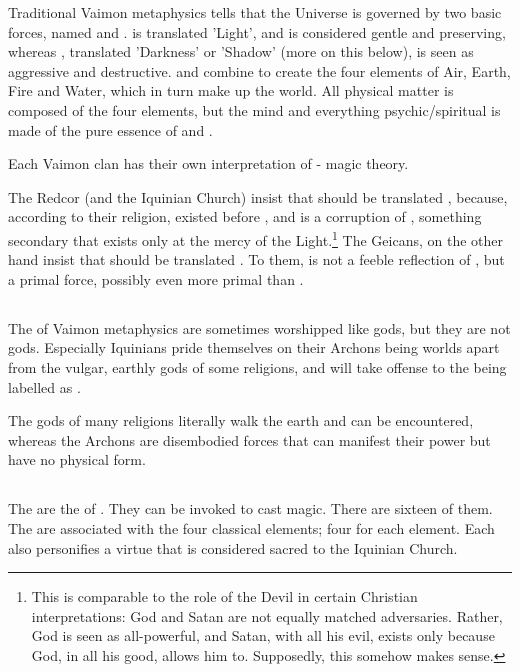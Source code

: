 Traditional Vaimon metaphysics tells that the Universe is governed by two basic forces, named  and . \Iquin{} is translated 'Light', and is considered gentle and preserving, whereas \Itzach{}, translated 'Darkness' or 'Shadow' (more on this below), is seen as aggressive and destructive. \Iquin{} and \Itzach{} combine to create the four elements of Air, Earth, Fire and Water, which in turn make up the world. All physical matter is composed of the four elements, but the mind and everything psychic/spiritual is made of the pure essence of \Iquin{} and \Itzach{}. 



Each Vaimon clan has their own interpretation of \Iquin{}-\Itzach{} magic theory. 

The Redcor (and the Iquinian Church) insist that \Itzach{} should be translated , because, according to their religion, \Iquin{} existed before \Itzach{}, and \Itzach{} is a corruption of \Iquin{}, something secondary that exists only at the mercy of the Light.\footnote{This is comparable to the role of the Devil in certain Christian interpretations: God and Satan are not equally matched adversaries. Rather, God is seen as all-powerful, and Satan, with all his evil, exists only because God, in all his good, allows him to. Supposedly, this somehow makes sense.} The Geicans, on the other hand insist that \Itzach{} should be translated . To them, \Itzach{} is not a feeble reflection of \Iquin{}, but a primal force, possibly even more primal than \Iquin{}. 

\subsection{\Archons{}}
The \Archons{} of Vaimon metaphysics are sometimes worshipped like gods, but they are not gods. Especially Iquinians pride themselves on their Archons being worlds apart from the vulgar, earthly gods of some religions, and will take offense to the \Archons{} being labelled as . 

The gods of many religions literally walk the earth and can be encountered, whereas the Archons are disembodied forces that can manifest their power but have no physical form. 

\subsection{\Sephiroth{}}
The \Sephiroth{} are the \Archons{} of \Iquin{}. They can be invoked to cast magic. There are sixteen of them. The \Sephiroth{} are associated with the four classical elements; four for each element. Each \Sephirah{} also personifies a virtue that is considered sacred to the Iquinian Church. 

